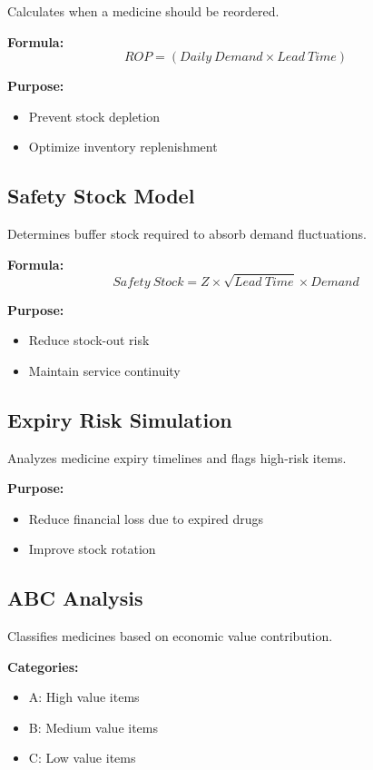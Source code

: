 \documentclass[12pt,a4paper]{article}
\begin{document}
Calculates when a medicine should be reordered.

\textbf{Formula:}
\[
ROP = (Daily\ Demand \times Lead\ Time)
\]

\textbf{Purpose:}
\begin{itemize}
\item Prevent stock depletion
\item Optimize inventory replenishment
\end{itemize}

\subsection{ Safety Stock Model}

Determines buffer stock required to absorb demand fluctuations.

\textbf{Formula:}
\[
Safety\ Stock = Z \times \sqrt{Lead\ Time} \times Demand
\]

\textbf{Purpose:}
\begin{itemize}
\item Reduce stock-out risk
\item Maintain service continuity
\end{itemize}

\subsection{ Expiry Risk Simulation}

Analyzes medicine expiry timelines and flags high-risk items.

\textbf{Purpose:}
\begin{itemize}
\item Reduce financial loss due to expired drugs
\item Improve stock rotation
\end{itemize}

\subsection{ ABC Analysis}

Classifies medicines based on economic value contribution.

\textbf{Categories:}
\begin{itemize}
\item A: High value items
\item B: Medium value items
\item C: Low value items
\end{itemize}
\end{document}
